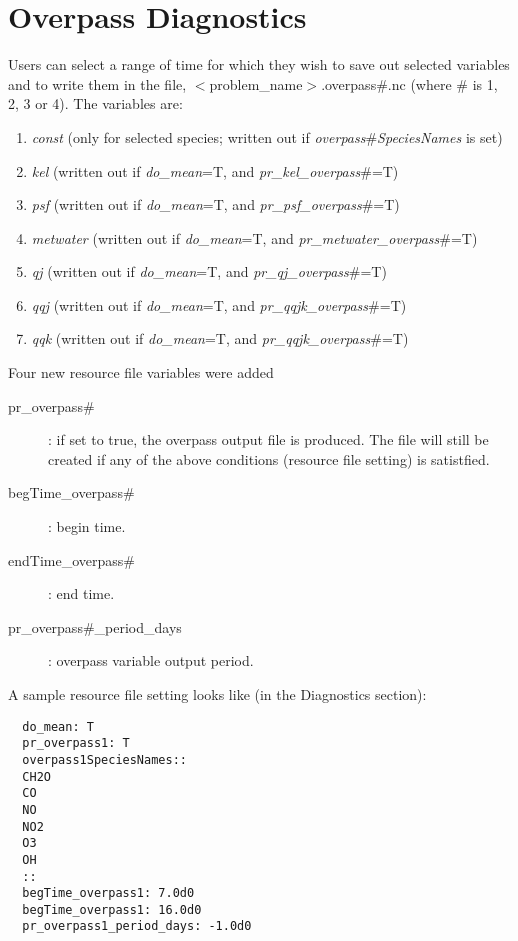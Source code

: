 \section{Overpass Diagnostics} \label{sec:noon_variable}
Users  can select a range of time for which they wish to save out
selected variables and to write them in the file, $<$problem\_name$>$.overpass$\#$.nc 
(where $\#$ is 1, 2, 3 or 4).
The variables are:
\begin{enumerate}
\item {\em const} (only for selected species; written out if {\em overpass$\#$SpeciesNames} is set)
\item {\em kel}       (written out if {\em do\_mean}=T, and {\em pr\_kel\_overpass$\#$}=T)
\item {\em psf}       (written out if {\em do\_mean}=T, and {\em pr\_psf\_overpass$\#$}=T)
\item {\em metwater} (written out if {\em do\_mean}=T,  and {\em pr\_metwater\_overpass$\#$}=T)
\item {\em qj}       (written out if {\em do\_mean}=T, and {\em pr\_qj\_overpass$\#$}=T)
\item {\em qqj}      (written out if {\em do\_mean}=T, and {\em pr\_qqjk\_overpass$\#$}=T)
\item {\em qqk}      (written out if {\em do\_mean}=T, and {\em pr\_qqjk\_overpass$\#$}=T)
\end{enumerate}
%
Four new resource file variables were added
\begin{description}
\item[pr\_overpass$\#$]: if set to true, the overpass output file is produced. 
      The file will still be created if any of the above conditions (resource file setting)
      is satistfied.
\item[begTime\_overpass$\#$]: begin time. 
\item[endTime\_overpass$\#$]: end time.
\item[pr\_overpass$\#$\_period\_days]: overpass variable output period.
\end{description}
%
A sample resource file setting looks like (in the Diagnostics section):
%
\begin{verbatim}
  do_mean: T
  pr_overpass1: T
  overpass1SpeciesNames::
  CH2O
  CO
  NO
  NO2
  O3
  OH
  ::
  begTime_overpass1: 7.0d0
  begTime_overpass1: 16.0d0
  pr_overpass1_period_days: -1.0d0
\end{verbatim}

